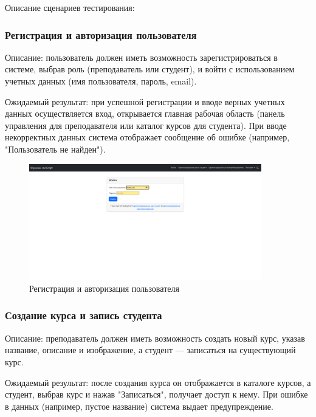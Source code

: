 Описание сценариев тестирования:


	
\subsubsection{Регистрация и авторизация пользователя}
	
Описание: пользователь должен иметь возможность зарегистрироваться в системе, выбрав роль (преподаватель или студент), и войти с использованием учетных данных (имя пользователя, пароль, email).
	
Ожидаемый результат: при успешной регистрации и вводе верных учетных данных осуществляется вход, открывается главная рабочая область (панель управления для преподавателя или каталог курсов для студента). При вводе некорректных данных система отображает сообщение об ошибке (например, "Пользователь не найден").
	
	\begin{figure}[ht]
		\centering
		\includegraphics[width=0.9\textwidth]{images/регистр} 
		\caption{Регистрация и авторизация пользователя}
		\label{login:image}
	\end{figure}
	
\subsubsection{Создание курса и запись студента}
	
Описание: преподаватель должен иметь возможность создать новый курс, указав название, описание и изображение, а студент — записаться на существующий курс.
	
Ожидаемый результат: после создания курса он отображается в каталоге курсов, а студент, выбрав курс и нажав "Записаться", получает доступ к нему. При ошибке в данных (например, пустое название) система выдает предупреждение.
	
